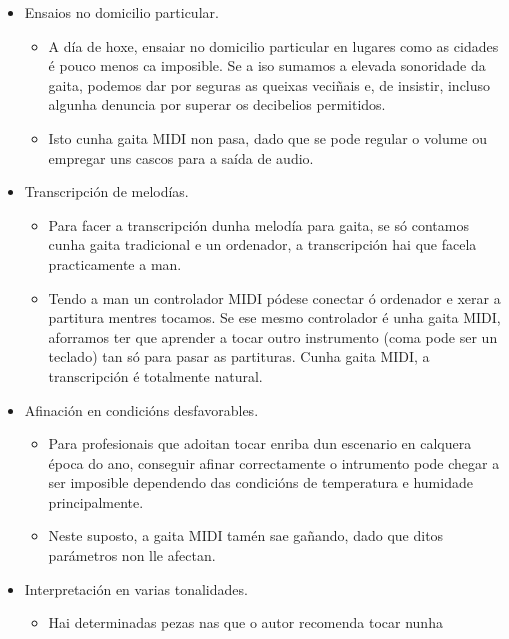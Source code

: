  \begin{itemize}
  \item Ensaios no domicilio particular.
        \begin{itemize}
         \item A día de hoxe, ensaiar no domicilio particular en lugares como
               as cidades é pouco menos ca imposible. Se a iso sumamos a
               elevada sonoridade da gaita, podemos dar por seguras as queixas
               veciñais e, de insistir, incluso algunha denuncia por superar os
               decibelios permitidos.
         \item Isto cunha gaita MIDI non pasa, dado que se pode regular o
               volume ou empregar uns cascos para a saída de audio.
        \end{itemize}
  \item Transcripción de melodías.
        \begin{itemize}
         \item Para facer a transcripción dunha melodía para gaita, se só
               contamos cunha gaita tradicional e un ordenador, a transcripción
               hai que facela practicamente a man.
         \item Tendo a man un controlador MIDI pódese conectar ó ordenador e
               xerar a partitura mentres tocamos. Se ese mesmo controlador é
               unha gaita MIDI, aforramos ter que aprender a tocar outro
               instrumento (coma pode ser un teclado) tan só para pasar as
               partituras. Cunha gaita MIDI, a transcripción é totalmente
               natural.
        \end{itemize}
  \item Afinación en condicións desfavorables.
        \begin{itemize}
         \item Para profesionais que adoitan tocar enriba dun escenario en
               calquera época do ano, conseguir afinar correctamente o
               intrumento pode chegar a ser imposible dependendo das condicións
               de temperatura e humidade principalmente.
         \item Neste suposto, a gaita MIDI tamén sae gañando, dado que ditos
               parámetros non lle afectan.
        \end{itemize}
  \item Interpretación en varias tonalidades.
        \begin{itemize}
         \item Hai determinadas pezas nas que o autor recomenda tocar nunha

\end{itemize}
\end{itemize}

